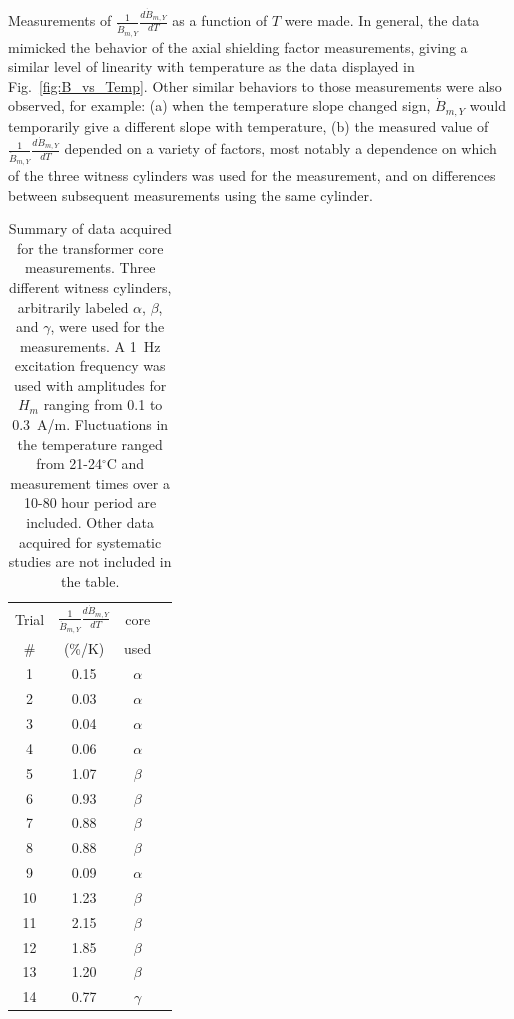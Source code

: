 Measurements of $\frac{1}{\dot{B}_{m,Y}}\frac{d\dot{B}_{m,Y}}{dT}$ as
a function of $T$ were made.  In general, the data mimicked the
behavior of the axial shielding factor measurements, giving a similar
level of linearity with temperature as the data displayed in
Fig.~\ref{fig:B_vs_Temp}.  Other similar behaviors to those
measurements were also observed, for example: (a) when the temperature
slope changed sign, $\dot{B}_{m,Y}$ would temporarily give a different
slope with temperature, (b) the measured value of
$\frac{1}{\dot{B}_{m,Y}}\frac{d\dot{B}_{m,Y}}{dT}$ depended on a
variety of factors, most notably a dependence on which of the three
witness cylinders was used for the measurement, and on differences
between subsequent measurements using the same cylinder.

\begin{table}
\begin{center}
\begin{tabular}{cccc}\hline
Trial & $\frac{1}{\dot{B}_{m,Y}}\frac{d\dot{B}_{m,Y}}{dT}$ & core \\
\#    & (\%/K) & used \\\hline
 1 & 0.15 & $\alpha$ \\
 2 & 0.03 & $\alpha$ \\
 3 & 0.04 & $\alpha$ \\
 4 & 0.06 & $\alpha$ \\
 5 & 1.07 & $\beta$  \\
 6 & 0.93 & $\beta$  \\
 7 & 0.88 & $\beta$  \\
 8 & 0.88 & $\beta$  \\
 9 & 0.09 & $\alpha$ \\
10 & 1.23 & $\beta$  \\
11 & 2.15 & $\beta$  \\
12 & 1.85 & $\beta$  \\
13 & 1.20 & $\beta$  \\
14 & 0.77 & $\gamma$ \\\hline
\end{tabular}
\caption{Summary of data acquired for the transformer core
  measurements.  Three different witness cylinders, arbitrarily
  labeled $\alpha$, $\beta$, and $\gamma$, were used for the
  measurements.  A 1~Hz excitation frequency was used with amplitudes
  for $H_m$ ranging from 0.1 to 0.3~A/m.  Fluctuations in the
  temperature ranged from 21-24$^\circ$C and measurement times over a
  10-80 hour period are included.  Other data acquired for systematic
  studies are not included in the table.\label{tab:transformer}}
\end{center}
\end{table}



